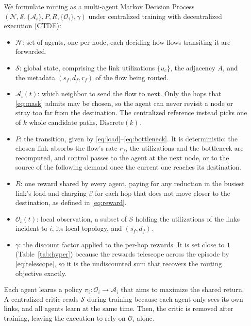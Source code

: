 We formulate routing as a multi-agent Markov Decision Process
$(\mathcal{N},\mathcal{S},\{\mathcal{A}_i\},\allowbreak P,R,\{\mathcal{O}_i\},\gamma)$
under centralized training with decentralized execution (CTDE):
\begin{itemize}
\item $\mathcal{N}$: set of agents, one per node, each deciding how flows
transiting it are forwarded.
\item $\mathcal{S}$: global state, comprising the link utilizations $\{u_e\}$, the
adjacency $A$, and the metadata $(s_f,d_f,r_f)$ of the flow being routed.
\item $\mathcal{A}_i(t)$: which neighbor to send the flow to next. Only the hops
that \eqref{eq:mask} admits may be chosen, so the agent can never revisit a node or
stray too far from the destination. The centralized reference instead picks one of
$k$ whole candidate paths, $\mathrm{Discrete}(k)$.
\item $P$: the transition, given by \eqref{eq:load}--\eqref{eq:bottleneck}. It is
deterministic: the chosen link absorbs the flow's rate $r_f$, the utilizations and the
bottleneck are recomputed, and control passes to the agent at the next node, or to the
source of the following demand once the current one reaches its destination.
\item $R$: one reward shared by every agent, paying for any reduction in the
busiest link's load and charging $\beta$ for each hop that does not move closer to
the destination, as defined in \eqref{eq:reward}.
\item $\mathcal{O}_i(t)$: local observation, a subset of $\mathcal{S}$ holding the
utilizations of the links incident to $i$, its local topology, and $(s_f,d_f)$.
\item $\gamma$: the discount factor applied to the per-hop rewards. It is set close to
$1$ (Table~\ref{tab:hyper}) because the rewards telescope across the episode by
\eqref{eq:telescope}, so it is the undiscounted sum that recovers the routing objective
exactly.
\end{itemize}
Each agent learns a policy $\pi_i:\mathcal{O}_i\to\mathcal{A}_i$ that aims to maximize the shared return. A centralized critic reads $\mathcal{S}$ during training because each agent only sees its own links, and all agents learn at the same time. Then, the critic is removed after training, leaving the execution to rely on $\mathcal{O}_i$ alone.

